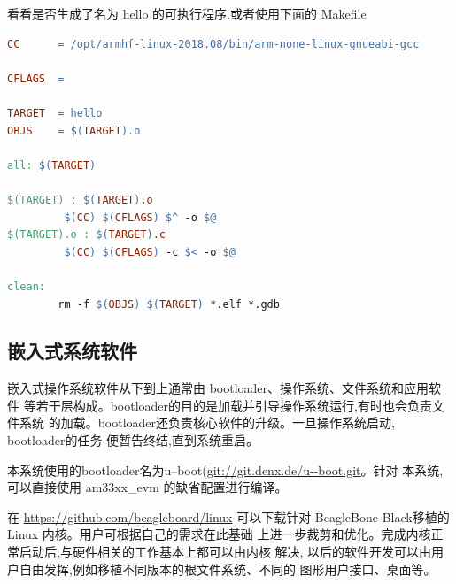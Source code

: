 看看是否生成了名为 hello 的可执行程序.或者使用下面的 Makefile

\begin{lstlisting}[language=make]
CC      = /opt/armhf-linux-2018.08/bin/arm-none-linux-gnueabi-gcc

CFLAGS  =

TARGET  = hello
OBJS    = $(TARGET).o

all: $(TARGET)

$(TARGET) : $(TARGET).o
         $(CC) $(CFLAGS) $^ -o $@
$(TARGET).o : $(TARGET).c
         $(CC) $(CFLAGS) -c $< -o $@

clean:
        rm -f $(OBJS) $(TARGET) *.elf *.gdb
\end{lstlisting}

\subsection{嵌入式系统软件}
嵌入式操作系统软件从下到上通常由 bootloader、操作系统、文件系统和应用软件
等若干层构成。bootloader的目的是加载并引导操作系统运行,有时也会负责文件系统
的加载。bootloader还负责核心软件的升级。一旦操作系统启动, bootloader的任务
便暂告终结,直到系统重启。

本系统使用的bootloader名为u--boot(\url{git://git.denx.de/u--boot.git}。针对
本系统, 可以直接使用 am33xx\_evm 的缺省配置进行编译。

在 \url{https://github.com/beagleboard/linux} 可以下载针对
BeagleBone-Black移植的 Linux 内核。用户可根据自己的需求在此基础
上进一步裁剪和优化。完成内核正常启动后,与硬件相关的工作基本上都可以由内核
解决, 以后的软件开发可以由用户自由发挥,例如移植不同版本的根文件系统、不同的
图形用户接口、桌面等。
